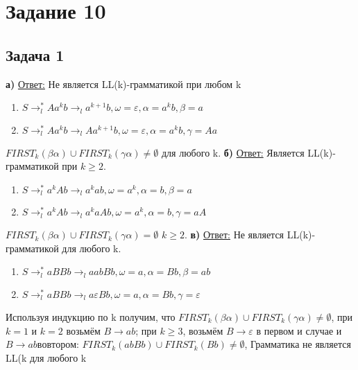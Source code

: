 \documentclass[a4paper,14pt]{article} %
\begin{document}

\section{Задание 10}
\subsection{Задача 1}
\textbf{а)}
\underline{Ответ:} Не является LL(k)-грамматикой при любом k
\begin{enumerate}
    \item $S \longrightarrow^*_l Aa^kb \longrightarrow_l a^{k+1}b, \omega = \varepsilon, \alpha = a^kb, \beta = a$
    \item $S \longrightarrow^*_l Aa^kb \longrightarrow_l Aa^{k+1}b, \omega = \varepsilon, \alpha = a^kb, \gamma = Aa$
\end{enumerate}
$FIRST_k(\beta \alpha) \cup FIRST_k(\gamma \alpha) \neq \emptyset$ для любого k.
\newline
\textbf{б)} \underline{Ответ:} Является LL(k)-грамматикой при $k \geqslant 2$.
\begin{enumerate}
    \item $S \longrightarrow^*_l a^kAb \longrightarrow_l a^{k}ab, \omega = a^k, \alpha = b, \beta = a$
    \item $S \longrightarrow^*_l a^kAb \longrightarrow_l a^kaAb, \omega = a^k, \alpha = b, \gamma = aA$
\end{enumerate}
$FIRST_k(\beta \alpha) \cup FIRST_k(\gamma \alpha) = \emptyset$  $k \geqslant 2$.
\newline
\textbf{в)} \underline{Ответ:} Не является LL(k)-грамматикой для любого k.
\begin{enumerate}
    \item $S \longrightarrow^*_l aBBb \longrightarrow_l aabBb, \omega = a, \alpha = Bb, \beta = ab$
    \item $S \longrightarrow^*_l aBBb \longrightarrow_l a \varepsilon Bb, \omega = a, \alpha = Bb, \gamma = \varepsilon$
\end{enumerate}
Используя индукцию по k получим, что $FIRST_k(\beta \alpha) \cup FIRST_k(\gamma \alpha) \neq \emptyset$, при $k = 1$ и $k = 2$ возьмём $B \longrightarrow ab$; при $k \geqslant 3$, возьмём $B \longrightarrow \varepsilon$ в первом и случае и $B \longrightarrow ab во втором$:
\newline
$FIRST_k(abBb) \cup FIRST_k(Bb) \neq \emptyset$, Грамматика не является LL(k для любого k
\newline
\end{document}
